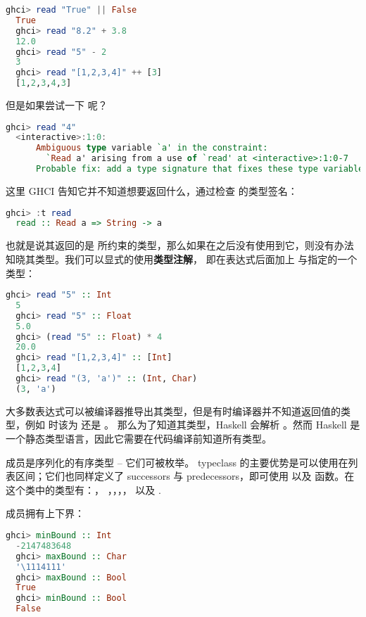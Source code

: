 \documentclass[./main.tex]{subfiles}
\begin{document}
\begin{lstlisting}[language=Haskell]
  ghci> read "True" || False
  True
  ghci> read "8.2" + 3.8
  12.0
  ghci> read "5" - 2
  3
  ghci> read "[1,2,3,4]" ++ [3]
  [1,2,3,4,3]
\end{lstlisting}

但是如果尝试一下  呢？

\begin{lstlisting}[language=Haskell]
  ghci> read "4"
  <interactive>:1:0:
      Ambiguous type variable `a' in the constraint:
        `Read a' arising from a use of `read' at <interactive>:1:0-7
      Probable fix: add a type signature that fixes these type variable(s)
\end{lstlisting}

这里 GHCI 告知它并不知道想要返回什么，通过检查  的类型签名：

\begin{lstlisting}[language=Haskell]
  ghci> :t read
  read :: Read a => String -> a
\end{lstlisting}

也就是说其返回的是  所约束的类型，那么如果在之后没有使用到它，则没有办法知晓其类型。我们可以显式的使用\textbf{类型注解}，
即在表达式后面加上 \acode{::} 与指定的一个类型：

\begin{lstlisting}[language=Haskell]
  ghci> read "5" :: Int
  5
  ghci> read "5" :: Float
  5.0
  ghci> (read "5" :: Float) * 4
  20.0
  ghci> read "[1,2,3,4]" :: [Int]
  [1,2,3,4]
  ghci> read "(3, 'a')" :: (Int, Char)
  (3, 'a')
\end{lstlisting}

大多数表达式可以被编译器推导出其类型，但是有时编译器并不知道返回值的类型，例如  时该为  还是 。
那么为了知道其类型，Haskell 会解析 。然而 Haskell 是一个静态类型语言，因此它需要在代码编译前知道所有类型。

 成员是序列化的有序类型 -- 它们可被枚举。 typeclass 的主要优势是可以使用在列表区间；它们也同样定义了
successors 与 predecessors，即可使用  以及  函数。在这个类中的类型有：\acode{()}，
，，，， 以及 .

 成员拥有上下界：

\begin{lstlisting}[language=Haskell]
  ghci> minBound :: Int
  -2147483648
  ghci> maxBound :: Char
  '\1114111'
  ghci> maxBound :: Bool
  True
  ghci> minBound :: Bool
  False
\end{lstlisting}
\end{document}
